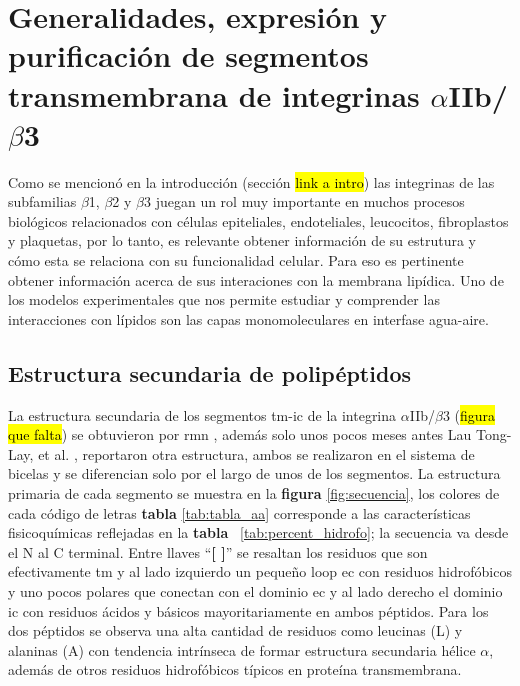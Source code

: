 \chapter{Generalidades, expresión y purificación de segmentos transmembrana de integrinas $\alpha$IIb/$\beta$3}\label{chap:pept}

Como se mencionó en la introducción (sección  \hl{link a intro}) las integrinas de las subfamilias $\beta$1, $\beta$2 y $\beta$3 juegan un rol muy importante en muchos procesos biológicos relacionados con células epiteliales, endoteliales, leucocitos, fibroplastos y plaquetas, por lo tanto, es relevante obtener información de su estrutura y cómo esta se relaciona con su funcionalidad celular. Para eso es pertinente obtener información acerca de sus interaciones con la membrana lipídica. Uno de los modelos experimentales que nos permite estudiar y comprender las interacciones con lípidos son las capas monomoleculares en interfase agua-aire.

\section{Estructura secundaria de polipéptidos}

La estructura secundaria de los segmentos \ac{tm}-\ac{ic} de la integrina $\alpha$IIb/$\beta$3 (\hl{figura que falta}) se obtuvieron por \ac{rmn} \cite{Yang2009}, además solo unos pocos meses antes Lau Tong-Lay, et al. \cite{Lau2008}, reportaron otra estructura, ambos se realizaron en el sistema de bicelas y se diferencian solo por el largo de unos de los segmentos. La estructura primaria de cada segmento se muestra en la \textbf{figura} \ref{fig:secuencia}, los colores de cada código de letras  \textbf{tabla} \ref{tab:tabla_aa} corresponde a las características fisicoquímicas reflejadas en la \textbf{tabla} ~\ref{tab:percent_hidrofo}; la secuencia va desde el N al C terminal. 
Entre llaves ``\textbf{[ ]}'' se resaltan los residuos que son efectivamente \ac{tm} y al lado izquierdo un pequeño loop \ac{ec} con residuos hidrofóbicos y uno pocos polares que conectan con el dominio \ac{ec} y al lado derecho el dominio \ac{ic} con residuos ácidos y básicos mayoritariamente en ambos péptidos. Para los dos péptidos se observa una alta cantidad de residuos como leucinas (L) y alaninas (A) con tendencia intrínseca de formar estructura secundaria hélice $\alpha$, además de otros residuos hidrofóbicos típicos en proteína transmembrana.


